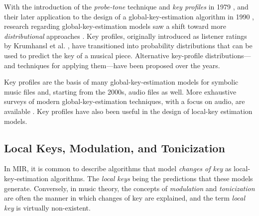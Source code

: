 \documentclass[sigconf]{acmart}
\begin{document}
With the introduction of the \emph{probe-tone} technique and \emph{key profiles} in 1979 \cite{krumhansl1979quantification}, and their later application to the design of a global-key-estimation algorithm in 1990 \cite{krumhansl1990cognitive}, research regarding global-key-estimation models saw a shift toward more \emph{distributional} approaches \cite{temperley2008pitch}. 
Key profiles, originally introduced as listener ratings by Krumhansl et al. \cite{krumhansl1979quantification, krumhansl1982tracing}, have transitioned into probability distributions that can be used to predict the key of a musical piece.
Alternative key-profile distributions---and techniques for applying them---have been proposed over the years.



Key profiles are the basis of many global-key-estimation models for symbolic music files and, starting from the 2000s, audio files as well. More exhaustive surveys of modern global-key-estimation techniques, with a focus on audio, are available \cite{korzeniowski2018harmonic, campbell2010automatic}. Key profiles have also been useful in the design of local-key estimation models.

\subsection{Local Keys, Modulation, and Tonicization}\label{ssec:terminology}

In MIR, it is common to describe algorithms that model \emph{changes of key} as local-key-estimation algorithms. 
The \emph{local keys} being the predictions that these models generate. Conversely, in music theory, the concepts of \emph{modulation} and \emph{tonicization} are often the manner in which changes of key are explained, and the term \emph{local key} is virtually non-existent.
\end{document}
